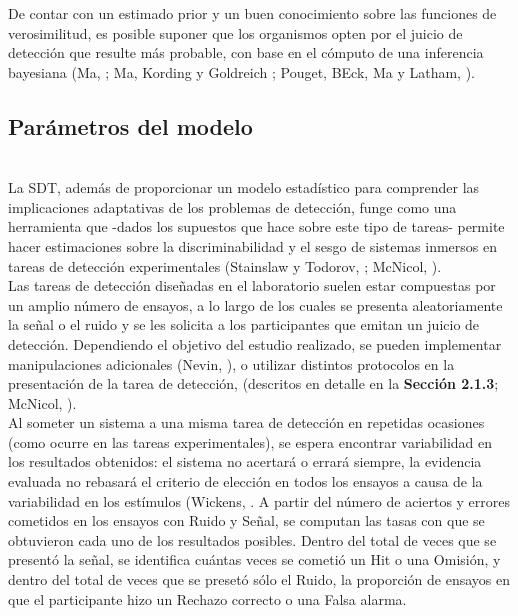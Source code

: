 De contar con un estimado prior y un buen conocimiento sobre las funciones de verosimilitud, es posible suponer que los organismos opten por el juicio de detección que resulte más probable, con base en el cómputo de una inferencia bayesiana (Ma, \citeyear{WeijiMa}; Ma, Kording y Goldreich \citeyear{WeijiMa2012}; Pouget, BEck, Ma y Latham, \citeyear{Pouget2013}).\\

\subsection{Parámetros del modelo}\\

La SDT, además de proporcionar un modelo estadístico para comprender las implicaciones adaptativas de los problemas de detección, funge como una herramienta que -dados los supuestos que hace sobre este tipo de tareas- permite hacer estimaciones sobre la discriminabilidad y el sesgo de sistemas inmersos en tareas de detección experimentales (Stainslaw y Todorov, \citeyear{Stainslaw1999}; McNicol, \citeyear{McNicol1}).\\

Las tareas de detección diseñadas en el laboratorio suelen estar compuestas por un amplio número de ensayos, a lo largo de los cuales se presenta aleatoriamente la señal o el ruido y se les solicita a los participantes que emitan un juicio de detección. Dependiendo el objetivo del estudio realizado, se pueden implementar manipulaciones adicionales (Nevin, \citeyear{Nevin1969}), o utilizar distintos protocolos en la presentación de la tarea de detección, (descritos en detalle en la \textbf{Sección 2.1.3}; McNicol, \citeyear{McNicol2}).\\

Al someter un sistema a una misma tarea de detección en repetidas ocasiones (como ocurre en las tareas experimentales), se espera encontrar variabilidad en los resultados obtenidos: el sistema no acertará o errará siempre, la evidencia evaluada no rebasará el criterio de elección en todos los ensayos a causa de la variabilidad en los estímulos (Wickens, \citeyear{Wickens1}. A partir del número de aciertos y errores cometidos en los ensayos con Ruido y Señal, se computan las tasas con que se obtuvieron cada uno de los resultados posibles. Dentro del total de veces que se presentó la señal, se identifica cuántas veces se cometió un Hit o una Omisión, y dentro del total de veces que se presetó sólo el Ruido, la proporción de ensayos en que el participante hizo un Rechazo correcto o una Falsa alarma.\\

